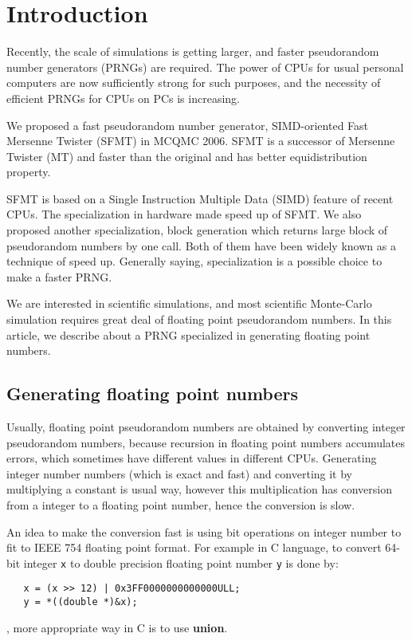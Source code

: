 \documentclass{svmult}
\begin{document}
\section {Introduction}
\label{sec:intro}

Recently, the scale of simulations is getting larger, and faster
pseudorandom number generators (PRNGs) are required. The power of CPUs
for usual personal computers are now sufficiently strong for such
purposes, and the necessity of efficient PRNGs for CPUs on PCs is
increasing.

We proposed a fast pseudorandom number generator, SIMD-oriented Fast
Mersenne Twister\cite{SFMT} (SFMT) in MCQMC 2006.  SFMT is a successor
of Mersenne Twister\cite{MT} (MT) and faster than the original and has
better equidistribution property.

SFMT is based on a Single Instruction Multiple Data\cite{wiki:SIMD}
(SIMD) feature of recent CPUs. The specialization in hardware made
speed up of SFMT. We also proposed another specialization, block
generation which returns large block of pseudorandom numbers by one
call.  Both of them have been widely known as a technique of speed
up.  Generally saying, specialization is a possible choice to make a
faster PRNG.

We are interested in scientific simulations, and most scientific
Monte-Carlo simulation requires great deal of floating point
pseudorandom numbers.  In this article, we describe about a PRNG
specialized in generating floating point numbers.

\subsection{Generating floating point numbers}
\label{sec:floating}

Usually, floating point pseudorandom numbers are obtained by
converting integer pseudorandom numbers, because recursion in floating
point numbers accumulates errors, which sometimes have different values
in different CPUs. Generating integer number numbers (which is exact and
fast) and converting it by multiplying a constant is usual way,
however this multiplication has conversion from a integer to
a floating point number, hence the conversion is slow.

An idea to make the conversion fast is using bit operations on integer
number to fit to IEEE 754 floating point format. For example in C
language, to convert 64-bit integer \texttt{x} to double precision floating
point number \texttt{y} is done by:
\begin{verbatim}
   x = (x >> 12) | 0x3FF0000000000000ULL;
   y = *((double *)&x);
\end{verbatim}, more appropriate way in C is to use \textbf{union}.
\end{document}
